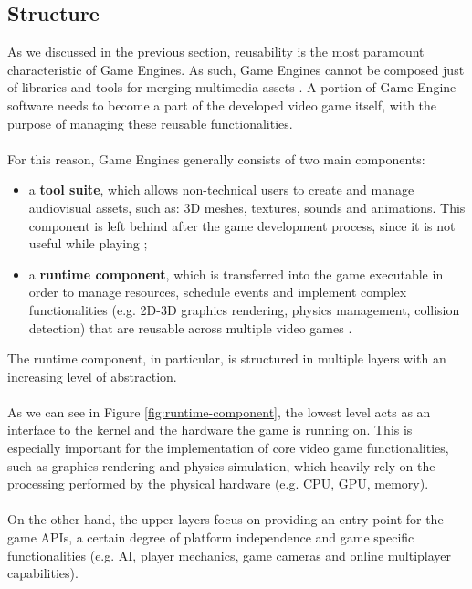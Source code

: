 \subsection{Structure}
As we discussed in the previous section, reusability is the most paramount characteristic of Game Engines. As such, Game Engines cannot be composed just of libraries and tools for merging multimedia assets \cite{womak:revamping-cloud-games}. A portion of Game Engine software needs to become a part of the developed video game itself, with the purpose of managing these reusable functionalities. \\ \\
For this reason, Game Engines generally consists of two main components:
\begin{itemize}
	\item a \textbf{tool suite}, which allows non-technical users to create and manage audiovisual assets, such as: 3D meshes, textures, sounds and animations. This component is left behind after the game development process, since it is not useful while playing \cite{womak:distributed-cloud-gaming-pipeline};
	\item a \textbf{runtime component}, which is transferred into the game executable in order to manage resources, schedule events and implement complex functionalities (e.g. 2D-3D graphics rendering, physics management, collision detection) that are reusable across multiple video games \cite{womak:gregory-game-engine, womak:revamping-cloud-games}.
\end{itemize}
The runtime component, in particular, is structured in multiple layers with an increasing level of abstraction. \cite{womak:revamping-cloud-games} \\ \\
As we can see in Figure \ref{fig:runtime-component}, the lowest level acts as an interface to the kernel and the hardware the game is running on. This is especially important for the implementation of core video game functionalities, such as graphics rendering and physics simulation, which heavily rely on the processing performed by the physical hardware (e.g. CPU, GPU, memory). \\ \\
On the other hand, the upper layers focus on providing an entry point for the game APIs, a certain degree of platform independence and game specific functionalities (e.g. AI, player mechanics, game cameras and online multiplayer capabilities).
